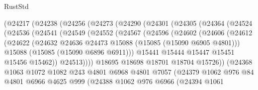 \begin{lexlean}{RustStd}
\begin{coremodule}
          (@24217
            (@24238
              (@24256
                (@24273
                  (@24290
                    (@24301
                      (@24305
                        (@24364
                          (@24524
                            (@24536
                              (@24541
                                (@24549
                                  (@24552
                                    (@24567
                                      (@24596
                                        (@24602
                                          (@24606
                                            (@24612
                                              (@24622
                                                (@24632
                                                  @24636
                                                  @24473
                                                  @15088
                                                  (@15085 (@15090 @6905 @4801)))
                                                @15088
                                                (@15085 (@15090 @6896 @6911)))
                                              @15441
                                              @15444
                                              @15447
                                              @15451
                                              @15456
                                              @15462))
                                          @24513))))
                                  @18695
                                  @18698
                                  @18701
                                  @18704
                                  @15726))
                              (@24368
                                @1063
                                @1072
                                @1082
                                @243
                                @4801
                                @6968
                                @4801
                                @7057
                                (@24379
                                  @1062
                                  @976
                                  @84
                                  @4801
                                  @6966
                                  @4625
                                  @999
                                  (@24388
                                    @1062
                                    @976
                                    @6966
                                    (@24394
                                      @1061

\end{coremodule}
\end{lexlean}
